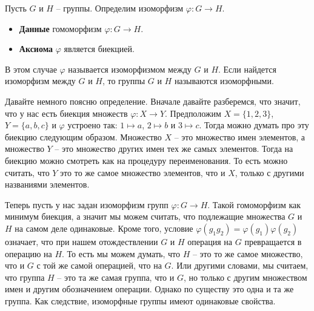 \begin{definition}
\label{def::IsomorphismGr}
Пусть $G$ и $H$ -- группы.
Определим изоморфизм $\varphi \colon G\to H$.
\begin{itemize}
\item \textbf{Данные} гомоморфизм $\varphi \colon G\to H$.

\item \textbf{Аксиома} $\varphi$ является биекцией.
\end{itemize}
В этом случае $\varphi$ называется изоморфизмом между $G$ и $H$.
Если найдется изоморфизм между $G$ и $H$, то группы $G$ и $H$ называются изоморфными.
\end{definition}

Давайте немного поясню определение.
Вначале давайте разберемся, что значит, что у нас есть биекция множеств $\varphi \colon X\to Y$.
Предположим $X = \{1, 2, 3\}$, $Y = \{a, b, c\}$ и $\varphi$ устроено так: $1 \mapsto a$, $2\mapsto b$ и $3\mapsto c$.
Тогда можно думать про эту биекцию следующим образом.
Множество $X$ -- это множество имен элементов, а множество $Y$ -- это множество других имен тех же самых элементов.
Тогда на биекцию можно смотреть как на процедуру переименования.
То есть можно считать, что $Y$ это то же самое множество элементов, что и $X$, только с другими названиями элементов.

Теперь пусть у нас задан изоморфизм групп $\varphi\colon G\to H$.
Такой гомоморфизм как минимум биекция, а значит мы можем считать, что подлежащие множества $G$ и $H$ на самом деле одинаковые.
Кроме того, условие $\varphi(g_1g_2) = \varphi(g_1) \varphi(g_2)$ означает, что при нашем отождествлении $G$ и $H$ операция на $G$ превращается в операцию на $H$.
То есть мы можем думать, что $H$ -- это то же самое множество, что и $G$ с той же самой операцией, что на $G$.
Или другими словами, мы считаем, что группа $H$ -- это та же самая группа, что и $G$, но только с другим множеством имен и другим обозначением операции.
Однако по существу это одна и та же группа.
Как следствие, изоморфные группы имеют одинаковые свойства.

